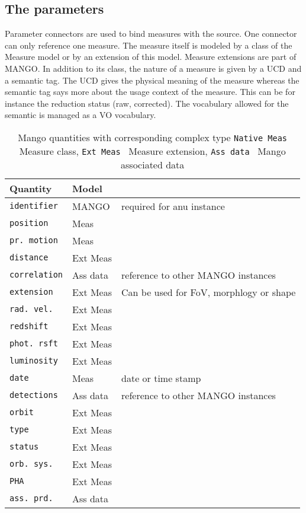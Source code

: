 \documentclass[11pt,a4paper]{ivoa}
\begin{document}
\subsection{The parameters}
Parameter connectors are used to bind measures with the source. One connector can only reference one measure. The measure itself is modeled by a class of the Measure model or by an extension of this model. Measure extensions are part of MANGO.
In addition to its class, the nature of a measure is given by a UCD and a semantic tag. The UCD gives the physical meaning of the measure whereas the semantic tag says more about the usage context of the measure. This can be for instance the reduction status (raw, corrected). The vocabulary allowed for the semantic is managed as a VO vocabulary.


\begin{table}[ht!]
     \tiny
     \begin{tabular}{|p{2.4cm}|p{1.8cm}|p{7cm}|}
       \hline Quantity &  Model &  \\
       \hline  \texttt{identifier}      & MANGO & required for anu instance\\
       \hline  \texttt{position}      &  Meas &  \\
       \hline  \texttt{pr. motion}   & Meas &     \\
       \hline  \texttt{distance}     & Ext Meas &     \\
       \hline  \texttt{correlation}   & Ass data & reference to other MANGO instances     \\
       \hline  \texttt{extension}     & Ext Meas & Can be used for FoV, morphlogy or shape\\
       \hline  \texttt{rad. vel.}       &  Ext Meas  &       \\
       \hline  \texttt{redshift}        &   Ext Meas  &  \\
       \hline  \texttt{phot. rsft}      & Ext Meas&    \\
       \hline  \texttt{luminosity}    & Ext Meas&\\
       \hline  \texttt{date}             & Meas & date or time stamp\\
       \hline  \texttt{detections}    & Ass data & reference to other MANGO instances   \\
       \hline  \texttt{orbit}             & Ext Meas&      \\
       \hline  \texttt{type}             &Ext Meas&     \\
       \hline  \texttt{status}          &Ext Meas&     \\
       \hline  \texttt{orb. sys.}      &Ext Meas&     \\
       \hline  \texttt{PHA}            &Ext Meas&     \\
       \hline  \texttt{ass. prd.}     &Ass data&  \\
       \hline
     \end{tabular}
     \caption{ Mango quantities with  corresponding complex type  \texttt{Native Meas} Measure class, \texttt{Ext Meas } Measure extension, \texttt{Ass data  } Mango associated data}
 \end{table}
\end{document}
